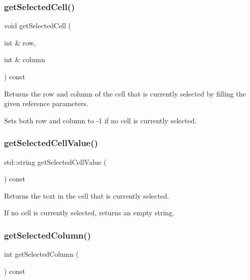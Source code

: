 \subsubsection{\texorpdfstring{get\+Selected\+Cell()}{getSelectedCell()}\hspace{0.1cm}{\footnotesize\ttfamily [2/2]}}
{\footnotesize\ttfamily void get\+Selected\+Cell (\begin{DoxyParamCaption}\item[{int \&}]{row,  }\item[{int \&}]{column }\end{DoxyParamCaption}) const\hspace{0.3cm}{\ttfamily [virtual]}}



Returns the row and column of the cell that is currently selected by filling the given reference parameters. 

Sets both row and column to -\/1 if no cell is currently selected. \mbox{\label{classsgl_1_1GTable_a8963c035a687a8393cd1f56ae05f582e}} 
\subsubsection{\texorpdfstring{get\+Selected\+Cell\+Value()}{getSelectedCellValue()}}
{\footnotesize\ttfamily std\+::string get\+Selected\+Cell\+Value (\begin{DoxyParamCaption}{ }\end{DoxyParamCaption}) const\hspace{0.3cm}{\ttfamily [virtual]}}



Returns the text in the cell that is currently selected. 

If no cell is currently selected, returns an empty string. \mbox{\label{classsgl_1_1GTable_abeec6fda3c331aa187ba1b695b19d435}} 
\subsubsection{\texorpdfstring{get\+Selected\+Column()}{getSelectedColumn()}}
{\footnotesize\ttfamily int get\+Selected\+Column (\begin{DoxyParamCaption}{ }\end{DoxyParamCaption}) const\hspace{0.3cm}{\ttfamily [virtual]}}



